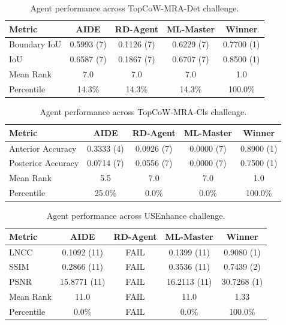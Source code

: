 \begin{table}[htbp]
\centering
\small
\caption{Agent performance across TopCoW-MRA-Det challenge.}
\vspace{3pt} \label{tab:topcow-track2-task2}
\begin{tabular}{lcccc}
\toprule
\textbf{Metric} & \textbf{AIDE} & \textbf{RD-Agent} & \textbf{ML-Master} & \textbf{Winner} \\
\midrule
Boundary IoU & 0.5993 (7) & 0.1126 (7) & 0.6229 (7) & 0.7700 (1) \\
IoU & 0.6587 (7) & 0.1867 (7) & 0.6707 (7) & 0.8500 (1) \\
\midrule
Mean Rank & 7.0 & 7.0 & 7.0 & 1.0 \\
Percentile & 14.3\% & 14.3\% & 14.3\% & 100.0\% \\
\bottomrule
\end{tabular}
\end{table}

\begin{table}[htbp]
\centering
\small
\caption{Agent performance across TopCoW-MRA-Cls challenge.}
\vspace{3pt} \label{tab:topcow-track2-task3}
\begin{tabular}{lcccc}
\toprule
\textbf{Metric} & \textbf{AIDE} & \textbf{RD-Agent} & \textbf{ML-Master} & \textbf{Winner} \\
\midrule
Anterior Accuracy & 0.3333 (4) & 0.0926 (7) & 0.0000 (7) & 0.8900 (1) \\
Posterior Accuracy & 0.0714 (7) & 0.0556 (7) & 0.0000 (7) & 0.7500 (1) \\
\midrule
Mean Rank & 5.5 & 7.0 & 7.0 & 1.0 \\
Percentile & 25.0\% & 0.0\% & 0.0\% & 100.0\% \\
\bottomrule
\end{tabular}
\end{table}

\begin{table}[!t]
\centering
\small
\caption{Agent performance across USEnhance challenge.}
\vspace{3pt} \label{tab:usenhance}
\begin{tabular}{lcccc}
\toprule
\textbf{Metric} & \textbf{AIDE} & \textbf{RD-Agent} & \textbf{ML-Master} & \textbf{Winner} \\
\midrule
LNCC & 0.1092 (11) & FAIL & 0.1399 (11) & 0.9080 (1) \\
SSIM & 0.2866 (11) & FAIL & 0.3536 (11) & 0.7439 (2) \\
PSNR & 15.8771 (11) & FAIL & 16.2113 (11) & 30.7268 (1) \\
\midrule
Mean Rank & 11.0 & FAIL & 11.0 & 1.33 \\
Percentile & 0.0\% & FAIL & 0.0\% & 100.0\% \\
\bottomrule
\end{tabular}
\end{table}

